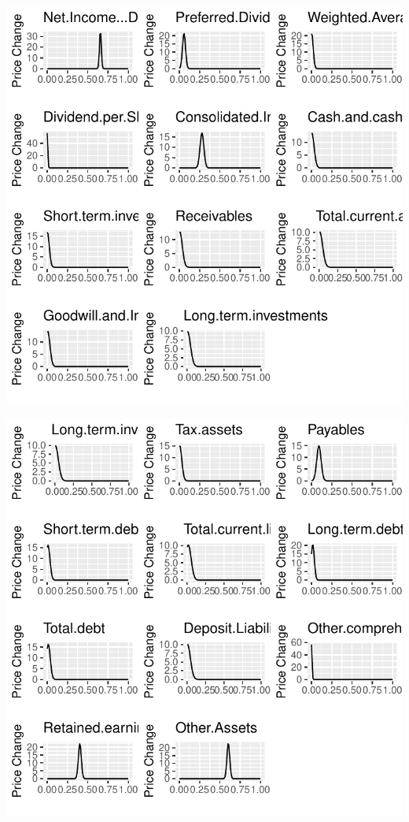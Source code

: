 \documentclass[11pt,]{article}
\begin{document}
\begin{center}\includegraphics{stock_analysis_files/figure-latex/data normal distribution plot2-1} \end{center}

\begin{center}\includegraphics{stock_analysis_files/figure-latex/data normal distribution plot3-1} \end{center}
\end{document}
